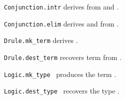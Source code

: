 \begin{isabellebody}
\begin{isamarkuptext}
  \begin{description}

  \item \verb|Conjunction.intr| derives  from  and .

  \item \verb|Conjunction.elim| derives  and 
  from .

  \item \verb|Drule.mk_term| derives .

  \item \verb|Drule.dest_term| recovers term  from .

  \item \verb|Logic.mk_type|~\isa{{\isasymtau}} produces the term .

  \item \verb|Logic.dest_type|~ recovers the type
  \isa{{\isasymtau}}.


\end{description}
\end{isamarkuptext}
\end{isabellebody}
